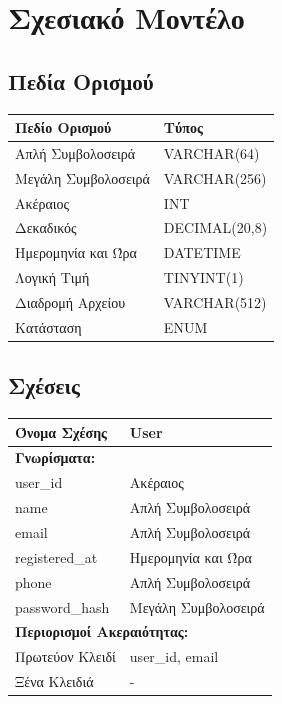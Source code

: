 \section{Σχεσιακό Μοντέλο}

\subsection{Πεδία Ορισμού}

\begin{tabular}{|p{6cm}|p{6cm}|}
\hline
\textbf{Πεδίο Ορισμού} & \textbf{Τύπος} \\ \hline

Απλή Συμβολοσειρά & VARCHAR(64) \\ \hline
Μεγάλη Συμβολοσειρά & VARCHAR(256) \\ \hline
Ακέραιος & INT \\ \hline
Δεκαδικός & DECIMAL(20,8) \\ \hline
Ημερομηνία και Ώρα & DATETIME \\ \hline
Λογική Τιμή & TINYINT(1) \\ \hline
Διαδρομή Αρχείου & VARCHAR(512) \\ \hline
Κατάσταση & ENUM \\ \hline

\end{tabular}

\newpage

\subsection{Σχέσεις}

\noindent
\begin{tabular}{|p{6cm}|p{6cm}|}
\hline
\textbf{Όνομα Σχέσης} & User \\ \hline

\multicolumn{2}{|l|}{\textbf{Γνωρίσματα:}} \\ \hline
user\_id & Ακέραιος \\ \hline
name & Απλή Συμβολοσειρά \\ \hline
email & Απλή Συμβολοσειρά \\ \hline
registered\_at & Ημερομηνία και Ώρα \\ \hline
phone & Απλή Συμβολοσειρά \\ \hline
password\_hash & Μεγάλη Συμβολοσειρά \\ \hline

\multicolumn{2}{|l|}{\textbf{Περιορισμοί Ακεραιότητας:}} \\ \hline
Πρωτεύον Κλειδί & user\_id, email \\ \hline
Ξένα Κλειδιά & - \\ \hline
\end{tabular}

